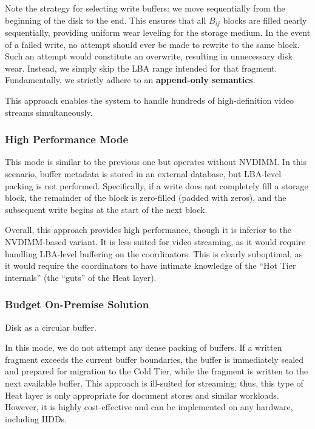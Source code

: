 \documentclass[a4paper,12pt]{article}
\begin{document}
    Note the strategy for selecting write buffers: we move sequentially from the beginning of the disk to the end. This ensures that all $B_{ij}$ blocks are filled nearly sequentially, providing uniform wear leveling for the storage medium. In the event of a failed write, no attempt should ever be made to rewrite to the same block. Such an attempt would constitute an overwrite, resulting in unnecessary disk wear. Instead, we simply skip the LBA range intended for that fragment. Fundamentally, we strictly adhere to an \textbf{append-only semantics}.

    \smallskip
    This approach enables the system to handle hundreds of high-definition video streams simultaneously.

    \subsubsection{High Performance Mode}

    This mode is similar to the previous one but operates without NVDIMM. In this scenario, buffer metadata is stored in an external database, but LBA-level packing is not performed. Specifically, if a write does not completely fill a storage block, the remainder of the block is zero-filled (padded with zeros), and the subsequent write begins at the start of the next block.

    Overall, this approach provides high performance, though it is inferior to the NVDIMM-based variant. It is less suited for video streaming, as it would require handling LBA-level buffering on the coordinators. This is clearly suboptimal, as it would require the coordinators to have intimate knowledge of the \enquote{Hot Tier internals} (the \enquote{guts} of the Heat layer).

    \subsubsection{Budget On-Premise Solution}

    Disk as a circular buffer.
    \smallskip

    In this mode, we do not attempt any dense packing of buffers. If a written fragment exceeds the current buffer boundaries, the buffer is immediately sealed and prepared for migration to the Cold Tier, while the fragment is written to the next available buffer. This approach is ill-suited for streaming; thus, this type of Heat layer is only appropriate for document stores and similar workloads. However, it is highly cost-effective and can be implemented on any hardware, including HDDs.
\end{document}
